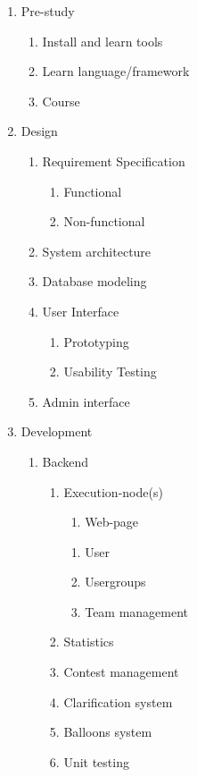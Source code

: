\begin{framed}
\begin{enumerate}
        \item Pre-study        
        \begin{enumerate}
            \item Install and learn tools
            \item Learn language/framework
            \item Course
        \end{enumerate}
        \item Design
        \begin{enumerate}
            \item Requirement Specification
            \begin{enumerate}
                \item Functional
                \item Non-functional
            \end{enumerate}
            \item  System architecture
            \item Database modeling
            \item User Interface
            \begin{enumerate}
                \item Prototyping
                \item Usability Testing
            \end{enumerate}
            \item  Admin interface
        \end{enumerate}

        \item Development
        \begin{enumerate}
            \item  Backend
            \begin{enumerate}
                \item Execution-node(s)
                \begin{enumerate}
                    \item Web-page
                \end{enumerate}
            \begin{enumerate}
                \item User
                \item Usergroups
                \item Team management
            \end{enumerate}
            \item  Statistics
            \item Contest management 
            \item Clarification system
            \item Balloons system
            \item Unit testing
        \end{enumerate}


\end{enumerate}
\end{enumerate}
\end{framed}
